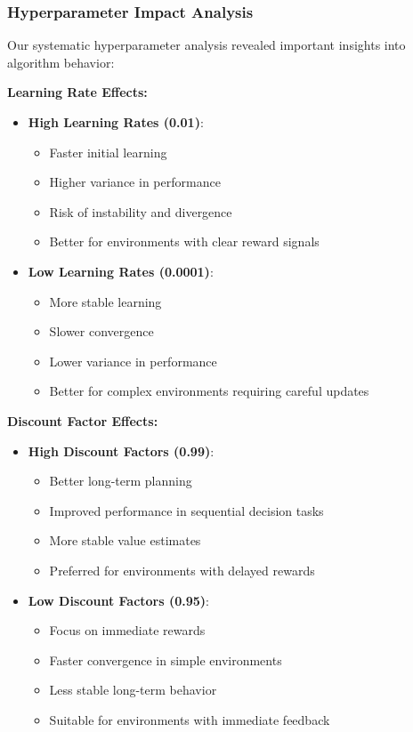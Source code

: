 \documentclass[12pt]{article}
\begin{document}
{{{\subsubsection{Hyperparameter Impact Analysis}

Our systematic hyperparameter analysis revealed important insights into algorithm behavior:

\textbf{Learning Rate Effects:}
\begin{itemize}
    \item \textbf{High Learning Rates (0.01)}: 
        \begin{itemize}
            \item Faster initial learning
            \item Higher variance in performance
            \item Risk of instability and divergence
            \item Better for environments with clear reward signals
        \end{itemize}
    \item \textbf{Low Learning Rates (0.0001)}:
        \begin{itemize}
            \item More stable learning
            \item Slower convergence
            \item Lower variance in performance
            \item Better for complex environments requiring careful updates
        \end{itemize}
\end{itemize}

\textbf{Discount Factor Effects:}
\begin{itemize}
    \item \textbf{High Discount Factors (0.99)}:
        \begin{itemize}
            \item Better long-term planning
            \item Improved performance in sequential decision tasks
            \item More stable value estimates
            \item Preferred for environments with delayed rewards
        \end{itemize}
    \item \textbf{Low Discount Factors (0.95)}:
        \begin{itemize}
            \item Focus on immediate rewards
            \item Faster convergence in simple environments
            \item Less stable long-term behavior
            \item Suitable for environments with immediate feedback
        \end{itemize}
\end{itemize}

}}}
\end{document}
